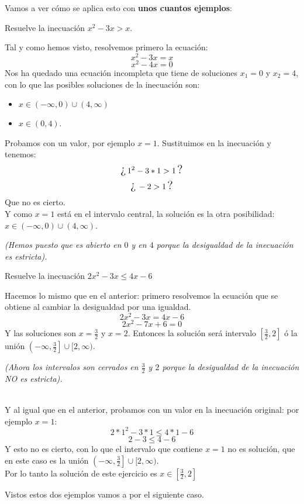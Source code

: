 \documentclass[a4paper,11pt,answers]{exam}
\newcommand{\testineq}[1]{\[\text{\Large{¿}}\,#1\,\text{\Large{?}}\]}
\begin{document}
Vamos a ver cómo se aplica esto con \textbf{unos cuantos ejemplos}:
\begin{questions}
\question Resuelve la inecuación $x^2- 3x > x$.
  \begin{solution}
    Tal y como hemos visto, resolvemos primero la ecuación:
    \[x^2 - 3x = x\]
    \[x^2 - 4x = 0\]
    Nos ha quedado una ecuación incompleta que tiene de soluciones $x_1=0$ y $x_2 = 4$, con lo
    que las posibles soluciones de la inecuación son:
    \begin{itemize}
    \item $x \in (-\infty, 0) \cup (4, \infty)$
    \item $x \in (0, 4)$.
    \end{itemize}
    Probamos con un valor, por ejemplo $x = 1$. Sustituimos en la inecuación y tenemos:
    \testineq{1^2 - 3*1 > 1}
    \testineq{-2 > 1}
    Que no es cierto.\\
    Y como $x = 1$ está en el intervalo central, la solución es la otra posibilidad:
    $x \in (-\infty, 0) \cup (4, \infty)$.\\
    \begin{small}
      \emph{(Hemos puesto que es abierto en $0$ y en $4$ porque la desigualdad de la inecuación
      es estricta).}
    \end{small}
  \end{solution}
\question Resuelve la inecuación $2x^2 - 3x \leq 4x -6$
  \begin{solution}
    Hacemos lo mismo que en el anterior: primero resolvemos la ecuación que se obtiene al
    cambiar la desigualdad por una igualdad.
    \[2x^2 - 3x = 4x - 6\]
    \[2x^2 - 7 x + 6 = 0\]
    Y las soluciones son $x = \frac{3}{2}$ y $x = 2$.
    Entonces la solución será intervalo $\left[\frac{3}{2}, 2\right]$ ó la unión
    $\left(-\infty, \frac{3}{2}\right] \cup [2, \infty)$.\\
    \begin{small}
      \emph{(Ahora los intervalos son cerrados en $\frac{3}{2}$ y $2$ porque la desigualdad
      de la inecuación NO es estricta).}
    \end{small}\\
    Y al igual que en el anterior, probamos con un valor en la inecuación original:
    por ejemplo $x = 1$:
    \[2*1^2 - 3*1 \leq 4*1 - 6\]
    \[2 - 3 \leq 4 -6\]
    Y esto no es cierto, con lo que el intervalo que contiene $x=1$ no es solución, que en este
    caso es la unión $\left(-\infty, \frac{3}{2}\right] \cup [2, \infty)$.\\
    Por lo tanto la solución de este ejercicio es $x \in \left[\frac{3}{2}, 2\right]$
  \end{solution}
\end{questions}
Vistos estos dos ejemplos vamos a por el siguiente caso.
\end{document}

